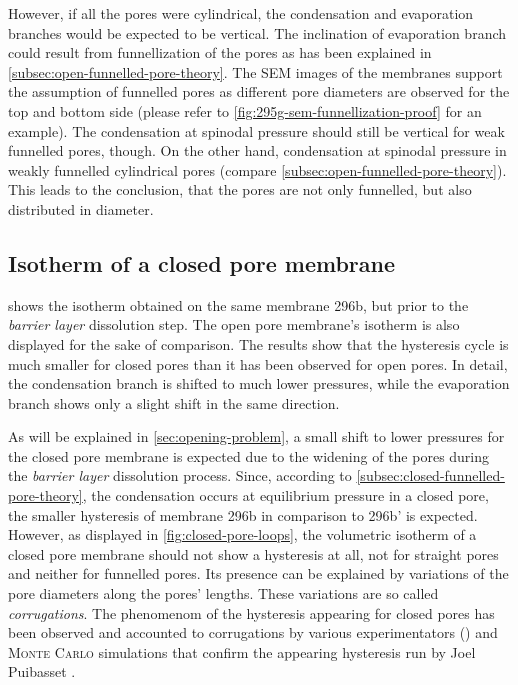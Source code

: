 \documentclass[../thesis.tex]{subfiles}
\begin{document}
        However, if all the pores were cylindrical, the condensation and evaporation branches would be expected to be vertical. The inclination of evaporation branch could result from funnellization of the pores as has been explained in \cref{subsec:open-funnelled-pore-theory}. The SEM images of the membranes support the assumption of funnelled pores as different pore diameters are observed for the top and  bottom side (please refer to \cref{fig:295g-sem-funnellization-proof} for an example).  The condensation at spinodal pressure should still be vertical for weak funnelled pores, though. On the other hand, condensation at spinodal pressure in weakly funnelled cylindrical pores (compare \cref{subsec:open-funnelled-pore-theory}). This leads to the conclusion, that the pores are not only funnelled, but also distributed in diameter.



    \subsection{Isotherm of a closed pore membrane}
    \label{subsec:closed-pore-isotherm}

        

         shows the isotherm obtained on the same membrane 296b, but prior to the \textit{barrier layer} dissolution step. The open pore membrane's isotherm is also displayed for the sake of comparison. The results show that the hysteresis cycle is much smaller for closed pores than it has been observed for open pores. In detail, the condensation branch is shifted to much lower pressures, while the evaporation branch shows only a slight shift in the same direction.

        As will be explained in \cref{sec:opening-problem}, a small shift to lower pressures for the closed pore membrane is expected due to the widening of the pores during the \textit{barrier layer} dissolution process. Since, according to \cref{subsec:closed-funnelled-pore-theory}, the condensation occurs at equilibrium pressure in a closed pore, the smaller hysteresis of membrane 296b in comparison to 296b' is expected. However, as displayed in \cref{fig:closed-pore-loops}, the volumetric isotherm of a closed pore membrane should not show a hysteresis at all, not for straight pores and neither for funnelled pores. Its presence can be explained by variations of the pore diameters along the pores' lengths. These variations are so called \textit{corrugations}. The phenomenom of the hysteresis appearing for closed pores has been observed and accounted to corrugations by various experimentators (\cite{Mistura2016a,Morishige2016}) and \textsc{Monte Carlo} simulations that confirm the appearing hysteresis run by Joel Puibasset \cite{Puibasset2007a}.
        \medskip
\end{document}
